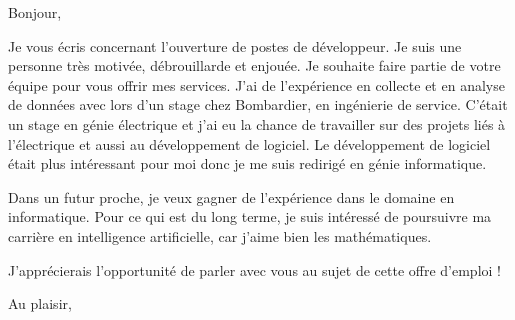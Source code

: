 \documentclass[12pt,french]{letter}
\begin{document}
\pagestyle{headings}

\begin{letter}{}
\address{Montréal, Canada}

\opening{Bonjour,}


Je vous écris concernant l'ouverture de postes de développeur.
Je suis une personne très motivée, débrouillarde et enjouée. Je souhaite faire partie de votre équipe pour vous offrir mes services. 
J'ai de l'expérience en collecte et en analyse de données avec lors d'un stage chez Bombardier, en ingénierie de service. C'était un stage en génie électrique et j'ai eu la chance de travailler sur des projets liés à l'électrique et aussi au développement de logiciel. Le développement de logiciel était plus intéressant pour moi donc je me suis redirigé en génie informatique.

Dans un futur proche, je veux gagner de l'expérience dans le domaine en informatique. Pour ce qui est du long terme, je suis intéressé de poursuivre ma carrière en intelligence artificielle, car j'aime bien les mathématiques.

J'apprécierais l'opportunité de parler avec vous au sujet de cette offre d'emploi !
\signature{Maxime}

\closing{Au plaisir,}


\end{letter}
\end{document}
